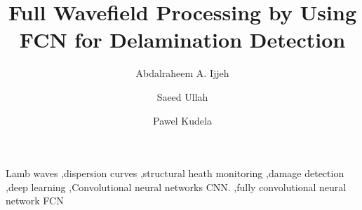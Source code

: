 \documentclass[preprint,9pt]{elsarticle}
\begin{document}
	\begin{frontmatter}
		
		\title{Full Wavefield Processing by Using FCN for Delamination Detection}
		
		\address[IFFM]{Institute of Fluid Flow Machinery, Polish Academy of Sciences, Poland}
		
		\author{Abdalraheem A. Ijjeh}
		\author{Saeed Ullah }
		\author{Pawel Kudela}
		
		
		\begin{abstract}
		
		\end{abstract}
		
		\begin{keyword}
			Lamb waves \sep dispersion curves \sep structural heath monitoring \sep damage detection \sep deep learning \sep Convolutional neural networks CNN. \sep fully convolutional neural network FCN
			
			
		\end{keyword}
		
	\end{frontmatter}

\end{document}
